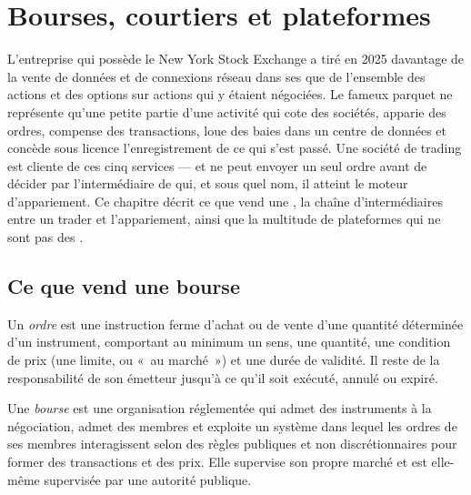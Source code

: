 \chapter{Bourses, courtiers et plateformes}\label{ch:m1:exchanges-brokers-venues}

L'entreprise qui possède le New York Stock Exchange a tiré en 2025 davantage
de la vente de données et de connexions réseau dans ses  que de
l'ensemble des actions et des options sur actions qui y étaient négociées. Le fameux parquet
ne représente qu'une petite partie d'une activité qui cote des sociétés, apparie des ordres, compense des transactions, loue des baies
dans un centre de données et concède sous licence l'enregistrement de ce qui s'est passé. Une société de trading est
cliente de ces cinq services --- et ne peut envoyer un seul ordre avant de décider
par l'intermédiaire de qui, et sous quel nom, il atteint le moteur d'appariement. Ce
chapitre décrit ce que vend une , la chaîne d'intermédiaires
entre un trader et l'appariement, ainsi que la multitude de plateformes qui ne sont pas
des .

\section{Ce que vend une bourse}

\begin{definition}[Ordre]\label{def:m1:exchanges-brokers-venues:order}
Un \emph{ordre} est une instruction ferme d'achat ou de vente
d'une quantité déterminée d'un instrument, comportant au minimum un sens, une quantité,
une condition de prix (une limite, ou «~au marché~») et une durée de validité. Il reste de la
responsabilité de son émetteur jusqu'à ce qu'il soit exécuté, annulé ou expiré.
\end{definition}

\begin{definition}[Bourse]\label{def:m1:exchanges-brokers-venues:exchange}
Une \emph{bourse} est une organisation réglementée qui admet
des instruments à la négociation, admet des membres et exploite un système dans lequel
les ordres de ses membres interagissent selon des règles publiques et non discrétionnaires pour former
des transactions et des prix. Elle supervise son propre marché et est elle-même supervisée par
une autorité publique.
\end{definition}

